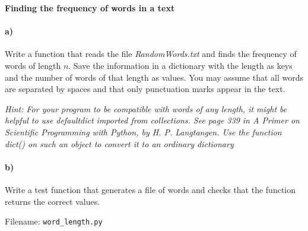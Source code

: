 \begin{Problem}{\textbf{Finding the frequency of words in a text}} \label{prob64}

\paragraph{a)}
Write a function that reads the file \emph{RandomWords.txt} and finds the frequency
of words of length $n$. Save the information in a dictionary with the length
as keys and the number of words of that length as values.  You may assume that
all words are separated by spaces and that only punctuation marks appear in the
text.

\emph{Hint: For your program to be compatible with words of any length, it might
be helpful to use defaultdict imported from collections. See page 339 in
\emph{A Primer on Scientific Programming with Python}, by H. P. Langtangen.
Use the function dict() on such an object to convert it to an ordinary dictionary}
\paragraph{b)}
Write a test function that generates a file of words and checks that the function
returns the correct values.

Filename: \texttt{word\_length.py}
\end{Problem}


